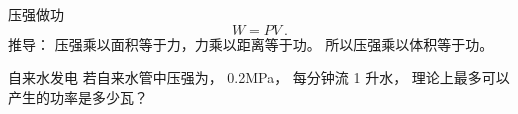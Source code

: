 
\begin{issues}
\issueDraft
\end{issues}

压强做功
\begin{equation}
W = PV~.
\end{equation}
推导： 压强乘以面积等于力，力乘以距离等于功。 所以压强乘以体积等于功。

\begin{example}{自来水发电}
若自来水管中压强为， 0.2MPa， 每分钟流 1 升水， 理论上最多可以产生的功率是多少瓦？
\end{example}
